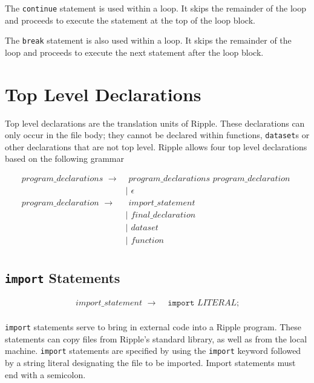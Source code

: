 \documentclass{article}
\newcommand{\code}{\texttt}
\begin{document}
The \code{continue} statement is used within a loop. It skips the remainder of the loop and proceeds to execute the statement at the top of the loop block.

The \code{break} statement is also used within a loop. It skips the remainder of the loop and proceeds to execute the next statement after the loop block.

\section{Top Level Declarations}
Top level declarations are the translation units of Ripple. These declarations can only occur in the file body; they cannot be declared within functions, \code{dataset}s or other declarations that are not top level. Ripple allows four top level declarations based on the following grammar

\begin{align*}
program\_declarations\,\,\rightarrow& \,\,program\_declarations\,\,program\_declaration\,\, \\
                                    &| \,\,\epsilon                                         \\
program\_declaration\,\,\rightarrow&  \,\,import\_statement  \\
                                   &| \,\,final\_declaration \\
                                   &| \,\,dataset            \\
                                   &| \,\,function           \\
\end{align*}

\subsection{\code{import} Statements}
\begin{align*}
import\_statement\,\,\rightarrow&\,\,\code{import}\,\,LITERAL\code{;}\\
\end{align*}

\code{import} statements serve to bring in external code into a Ripple program. These statements can copy files from Ripple's standard library, as well as from the local machine. \code{import} statements are specified by using the \code{import} keyword followed by a string literal designating the file to be imported. Import statements must end with a semicolon.
\end{document}
